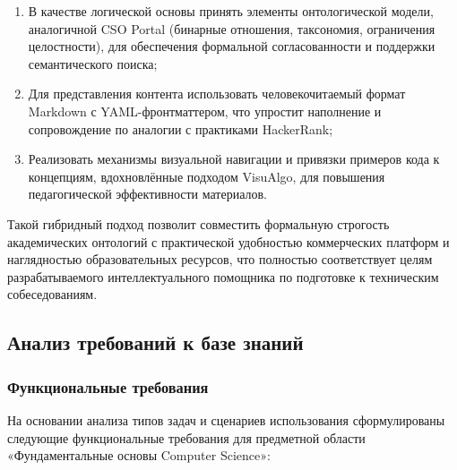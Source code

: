 \begin{enumerate}
    \item В качестве логической основы принять элементы онтологической модели, аналогичной CSO Portal (бинарные отношения, таксономия, ограничения целостности), для обеспечения формальной согласованности и поддержки семантического поиска;
    
    \item Для представления контента использовать человекочитаемый формат Markdown с YAML-фронтматтером, что упростит наполнение и сопровождение по аналогии с практиками HackerRank;
    
    \item Реализовать механизмы визуальной навигации и привязки примеров кода к концепциям, вдохновлённые подходом VisuAlgo, для повышения педагогической эффективности материалов.
\end{enumerate}

Такой гибридный подход позволит совместить формальную строгость академических онтологий с практической удобностью коммерческих платформ и наглядностью образовательных ресурсов, что полностью соответствует целям разрабатываемого интеллектуального помощника по подготовке к техническим собеседованиям.

\subsection{Анализ требований к базе знаний}

\subsubsection*{Функциональные требования}


На основании анализа типов задач и сценариев использования сформулированы следующие функциональные требования для предметной области «Фундаментальные основы Computer Science»:


